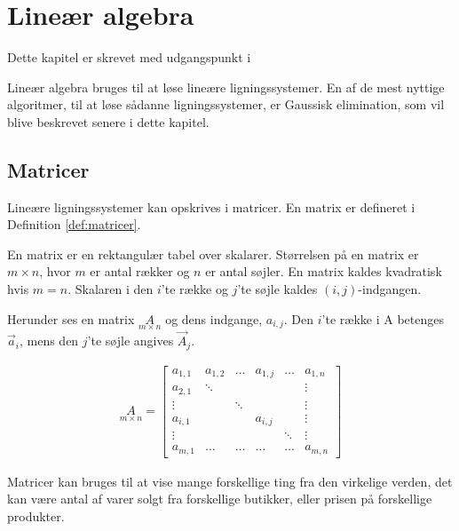 \chapter{Lineær algebra}
Dette kapitel er skrevet med udgangspunkt i 

Lineær algebra bruges til at løse lineære ligningssystemer. 
En af de mest nyttige algoritmer, til at løse sådanne ligningssystemer, er Gaussisk elimination, som vil blive beskrevet senere i dette kapitel.

\section{Matricer}
Lineære ligningssystemer kan opskrives i matricer. 
En matrix er defineret i Definition \ref{def:matricer}.

\begin{defn} [Matrix]\label{def:matricer}
En matrix er en rektangulær tabel over skalarer. 
Størrelsen på en matrix er $m \times n$, hvor $m$ er antal rækker og $n$ er antal søjler. 
En matrix kaldes kvadratisk hvis $m=n$. 
Skalaren i den $i$'te række og $j$'te søjle kaldes $(i,j)$-indgangen.
\end{defn}

Herunder ses en matrix $\underset{m \times n}{A}$ og dens indgange, $a_{i,j}$. Den $i$'te række i A betenges $\vec{a}_i$, mens den $j$'te søjle angives $\vec{A}_j$.

\begin{align*}
\underset{m \times n}{A} = \begin{bmatrix}
	a_{1,1} & a_{1,2} & \dots & a_{1,j} & \dots & a_{1,n} \\
	a_{2,1} & \ddots  &       &         &       & \vdots \\
	\vdots  &         & \ddots &        &       & \vdots \\
	a_{i,1} &         &       & a_{i,j} &       & \vdots \\
	\vdots  &         &       &         & \ddots& \vdots \\
	a_{m,1} & \dots   & \dots & \dots   & \dots & a_{m,n} 
\end{bmatrix}
\end{align*}

Matricer kan bruges til at vise mange forskellige ting fra den virkelige verden, det kan være antal af varer solgt fra forskellige butikker, eller prisen på forskellige produkter. 

